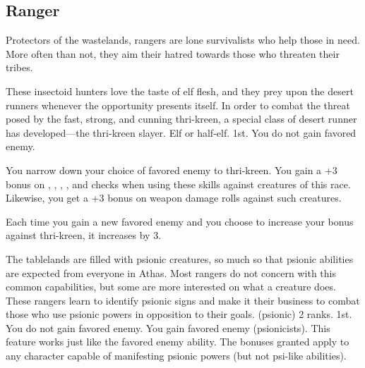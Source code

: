 \subsection{Ranger}
Protectors of the wastelands, rangers are lone survivalists who help those in need. More often than not, they aim their hatred towards those who threaten their tribes.

{These insectoid hunters love the taste of elf flesh, and they prey upon the desert runners whenever the  opportunity presents itself. In order to combat the threat posed by the fast, strong, and cunning thri-kreen, a special class of desert runner has developed---the thri-kreen slayer.}
{Elf or half-elf.}
{1st.}
{You do not gain favored enemy.}
{
	You narrow down your choice of favored enemy to thri-kreen. You gain a +3 bonus on , , , , and  checks when using these skills against creatures of this race. Likewise, you get a +3 bonus on weapon damage rolls against such creatures.

	Each time you gain a new favored enemy and you choose to increase your bonus against thri-kreen, it increases by 3.
}
{The tablelands are filled with psionic creatures, so much so that psionic abilities are expected from everyone in Athas. Most rangers do not concern with this common capabilities, but some are more interested on what a creature does. These rangers learn to identify psionic signs and make it their business to combat those who use psionic powers in opposition to their goals.}
{ (psionic) 2 ranks.}
{1st.}
{You do not gain favored enemy.}
{
	You gain favored enemy (psionicists). This feature works just like the favored enemy ability. The bonuses granted apply to any character capable of manifesting psionic powers (but not psi-like abilities).
}

